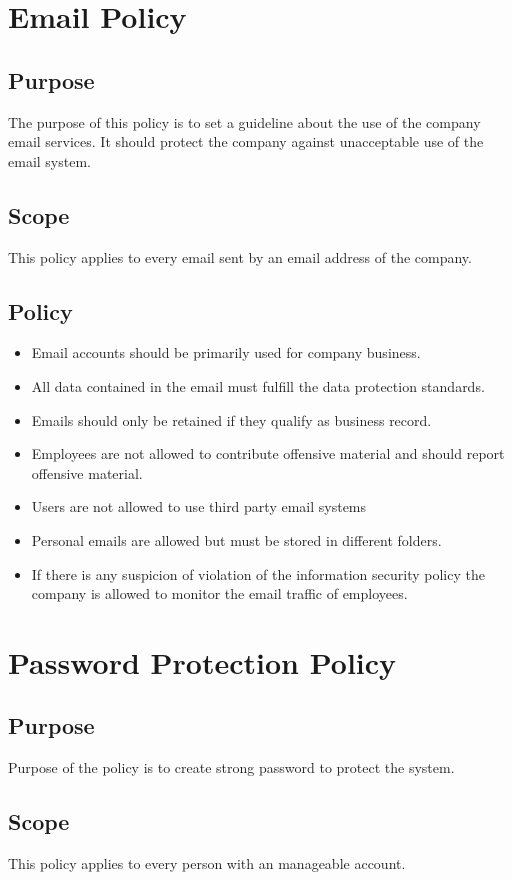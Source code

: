 \chapter{Email Policy}
\section{Purpose}
The purpose of this policy is to set a guideline about the use of the company email services. It should protect the company against unacceptable use of the email system\cite{Sans}.
\section{Scope}
This policy applies to every email sent by an email address of the company. 
\section{Policy}
\begin{itemize}
\item Email accounts should be primarily used for company business. 
\item All data contained in the email must fulfill the data protection standards.
\item Emails should only be retained if they qualify as business record.
\item Employees are not allowed to contribute offensive material and should report offensive material.
\item Users are not allowed to use third party email systems
\item Personal emails are allowed but must be stored in different folders.
\item If there is any suspicion of violation of the information security policy the company is allowed to monitor the email traffic of employees.  
\end{itemize}
\chapter{Password Protection Policy}
\section{Purpose}
Purpose of the policy is to create strong password to protect the system\cite{Sans}. 
\section{Scope}
This policy applies to every person with an manageable account.
